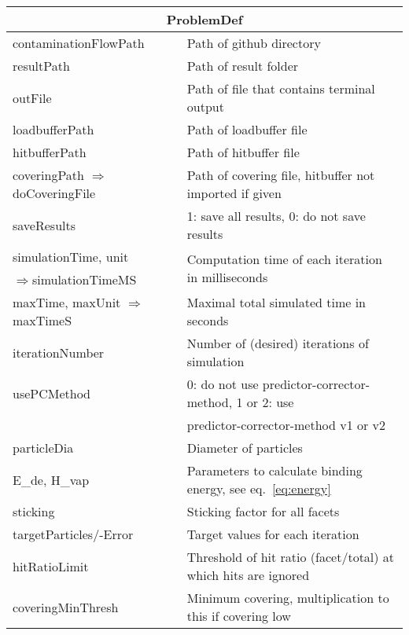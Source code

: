 \begin{center}
\begin{tabular}{|l|l|}
\hline
\multicolumn{2}{|c|}{\rule{0pt}{3ex}ProblemDef}\\
\hline
\rule{0pt}{3ex} contaminationFlowPath& Path of github directory\\
\rule{0pt}{3ex} resultPath& Path of result folder\\
\rule{0pt}{3ex} outFile& Path of file that contains terminal output\\
\rule{0pt}{3ex} loadbufferPath& Path of loadbuffer file\\
\rule{0pt}{3ex} hitbufferPath& Path of hitbuffer file\\
\rule{0pt}{3ex} coveringPath \scriptsize$\Rightarrow$doCoveringFile& Path of covering file, hitbuffer not imported if given\\
\rule{0pt}{3ex} saveResults& 1: save all results, 0: do not save results\\
\rule{0pt}{3ex} simulationTime, unit& \multirow{2}{*}{Computation time of each iteration in milliseconds}\\
\scriptsize\enskip$\Rightarrow$simulationTimeMS&\\
\rule{0pt}{3ex} maxTime, maxUnit \scriptsize$\Rightarrow$maxTimeS& Maximal total simulated time in seconds
\\
\rule{0pt}{3ex} iterationNumber& Number of (desired) iterations of simulation\\
\rule{0pt}{3ex} usePCMethod& 0: do not use predictor-corrector-method, 1 or 2: use \\ & predictor-corrector-method v1 or v2\\
\rule{0pt}{3ex} particleDia& Diameter of particles\\
\rule{0pt}{3ex}  E\_de, H\_vap& Parameters to calculate binding energy, see eq.\ \ref{eq:energy}\\ %
\rule{0pt}{3ex}  sticking&  Sticking factor for all facets\\
\rule{0pt}{3ex}  targetParticles/-Error&  Target values for each iteration\\
\rule{0pt}{3ex}  hitRatioLimit&  Threshold of hit ratio (facet/total) at which hits are ignored\\
\rule{0pt}{3ex}  coveringMinThresh&  Minimum covering, multiplication to this if covering low\\

\end{tabular}
\end{center}
